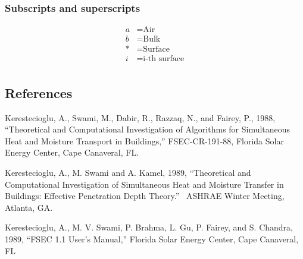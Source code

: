 \subsubsection{Subscripts and superscripts}\label{subscripts-and-superscripts}
\begin{align*}  
  a        &= \text{Air} \\
  b           &= \text{Bulk} \\
  *            &= \text{Surface} \\
  i            &= \text{i-th surface} \\
\end{align*}

\subsection{References}\label{references-019}

Kerestecioglu, A., Swami, M., Dabir, R., Razzaq, N., and Fairey, P., 1988, ``Theoretical and Computational Investigation of Algorithms for Simultaneous Heat and Moisture Transport in Buildings,'' FSEC-CR-191-88, Florida Solar Energy Center, Cape Canaveral, FL.

Kerestecioglu, A., M. Swami and A. Kamel, 1989, ``Theoretical and Computational Investigation of Simultaneous Heat and Moisture Transfer in Buildings: Effective Penetration Depth Theory.''~ ASHRAE Winter Meeting, Atlanta, GA.

Kerestecioglu, A., M. V. Swami, P. Brahma, L. Gu, P. Fairey, and S. Chandra, 1989, ``FSEC 1.1 User's Manual,'' Florida Solar Energy Center, Cape Canaveral, FL
